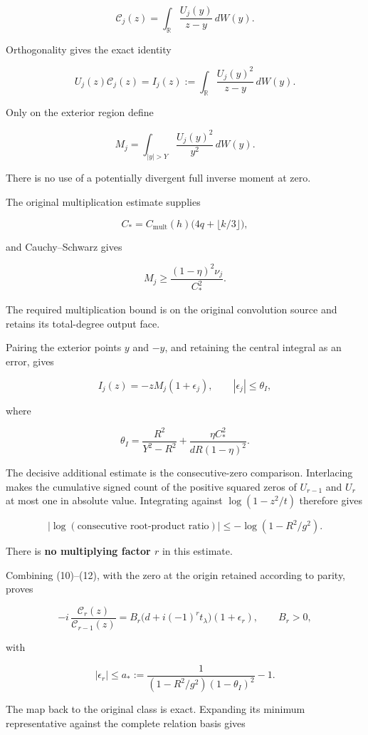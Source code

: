 \[
\mathscr C_j(z)=
\int_{\mathbb R}\frac{U_j(y)}{z-y}\,dW(y).
\]

Orthogonality gives the exact identity

\[
U_j(z)\mathscr C_j(z)
=
I_j(z)
:=
\int_{\mathbb R}\frac{U_j(y)^2}{z-y}\,dW(y).
\tag{10}
\]

Only on the exterior region define

\[
M_j=\int_{|y|>Y}\frac{U_j(y)^2}{y^2}\,dW(y).
\]

There is no use of a potentially divergent full inverse moment at zero.

The original multiplication estimate supplies

\[
C_*=C_{\mathrm{mult}}(h)
\bigl(4q+\lfloor k/3\rfloor\bigr),
\]

and Cauchy--Schwarz gives

\[
M_j\ge\frac{(1-\eta)^2\nu_j}{C_*^2}.
\]

The required multiplication bound is on the original convolution source and retains its total-degree output face.

Pairing the exterior points \(y\) and \(-y\), and retaining the central integral as an error, gives

\[
I_j(z)=-zM_j(1+\epsilon_j),
\qquad
|\epsilon_j|\le\theta_I,
\]

where

\[
\theta_I=
\frac{R^2}{Y^2-R^2}
+
\frac{\eta C_*^2}{dR(1-\eta)^2}.
\tag{11}
\]

The decisive additional estimate is the consecutive-zero comparison. Interlacing makes the cumulative signed count of the positive squared zeros of \(U_{r-1}\) and \(U_r\) at most one in absolute value. Integrating against \(\log(1-z^2/t)\) therefore gives

\[
\left|\log(\text{consecutive root-product ratio})\right|
\le
-\log(1-R^2/g^2).
\tag{12}
\]

There is \textbf{no multiplying factor \(r\)} in this estimate.

Combining (10)--(12), with the zero at the origin retained according to parity, proves

\[
-i\,\frac{\mathscr C_r(z)}{\mathscr C_{r-1}(z)}
=
B_r\bigl(d+i(-1)^rt_\lambda\bigr)(1+\epsilon_r),
\qquad B_r>0,
\]

with

\[
|\epsilon_r|\le
a_*:=
\frac1{(1-R^2/g^2)(1-\theta_I)^2}-1.
\tag{13}
\]

The map back to the original class is exact. Expanding its minimum representative against the complete relation basis gives

